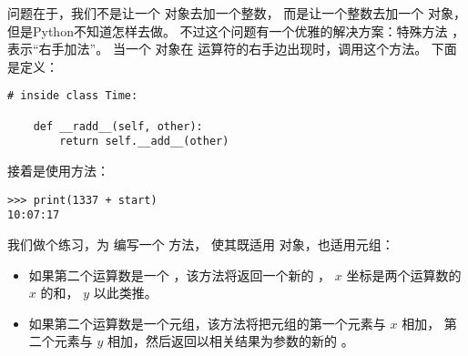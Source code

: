 问题在于，我们不是让一个  对象去加一个整数，
而是让一个整数去加一个  对象，但是Python不知道怎样去做。
不过这个问题有一个优雅的解决方案：特殊方法 ，表示“右手加法”。
当一个  对象在 \li{+} 运算符的右手边出现时，调用这个方法。  下面是定义：

  

\begin{lstlisting}
# inside class Time:

    def __radd__(self, other):
        return self.__add__(other)
\end{lstlisting}

%

接着是使用方法：

\begin{lstlisting}
>>> print(1337 + start)
10:07:17
\end{lstlisting}

%


我们做个练习，为  编写一个  方法，
使其既适用  对象，也适用元组：


\begin{itemize}

\item 如果第二个运算数是一个  ，该方法将返回一个新的 ，
$x$ 坐标是两个运算数的 $x$ 的和， $y$ 以此类推。

\item 如果第二个运算数是一个元组，该方法将把元组的第一个元素与 $x$ 相加，
第二个元素与 $y$ 相加，然后返回以相关结果为参数的新的 。

\end{itemize}



